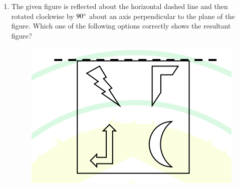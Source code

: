 \documentclass[journal]{IEEEtran}
\begin{document}
\begin{enumerate}[leftmargin=0pt]
\item
The given figure is reflected about the horizontal dashed line and then rotated clockwise by $90\degree$ about an axis perpendicular to the plane of the figure. Which one of the following options correctly shows the resultant figure?
\begin{figure}[H]\includegraphics[width=0.5\columnwidth]{Figs/image (89).png}\caption*{}\label{fig:q8}\end{figure}
\vspace{0.2cm}
\begin{enumerate}
\end{enumerate}
\end{enumerate}
\end{document}
